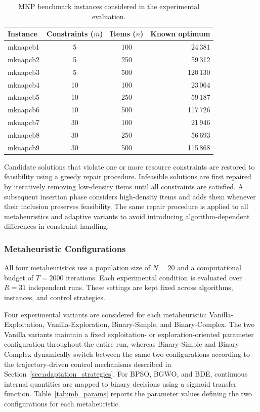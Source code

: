 \documentclass[journal,article,submit,moreauthors]{Definitions/mdpi}
\begin{document}
\begin{table}[htbp]
\centering
\caption{MKP benchmark instances considered in the experimental evaluation.}
\label{tab:instances}
\begin{tabular}{@{}l c c r@{}}
\toprule
\textbf{Instance} &
\textbf{Constraints ($m$)} &
\textbf{Items ($n$)} &
\textbf{Known optimum} \\
\midrule
mknapcb1 & 5  & 100 & 24\,381 \\
mknapcb2 & 5  & 250 & 59\,312 \\
mknapcb3 & 5  & 500 & 120\,130 \\
mknapcb4 & 10 & 100 & 23\,064 \\
mknapcb5 & 10 & 250 & 59\,187 \\
mknapcb6 & 10 & 500 & 117\,726 \\
mknapcb7 & 30 & 100 & 21\,946 \\
mknapcb8 & 30 & 250 & 56\,693 \\
mknapcb9 & 30 & 500 & 115\,868 \\
\bottomrule
\end{tabular}
\end{table}

Candidate solutions that violate one or more resource constraints are
restored to feasibility using a greedy repair procedure. Infeasible
solutions are first repaired by iteratively removing low-density items until
all constraints are satisfied. A subsequent insertion phase considers
high-density items and adds them whenever their inclusion preserves
feasibility. The same repair procedure is applied to all metaheuristics and
adaptive variants to avoid introducing algorithm-dependent differences in
constraint handling.


\subsubsection{Metaheuristic Configurations}
\label{sec:mh_config}

All four metaheuristics use a population size of $N=20$ and a computational
budget of $T=2000$ iterations. Each experimental condition is evaluated over
$R=31$ independent runs. These settings are kept fixed across algorithms,
instances, and control strategies.

Four experimental variants are considered for each metaheuristic:
Vanilla-Exploitation, Vanilla-Exploration, Binary-Simple, and Binary-Complex.
The two Vanilla variants maintain a fixed exploitation- or
exploration-oriented parameter configuration throughout the entire run,
whereas Binary-Simple and Binary-Complex dynamically switch between the same
two configurations according to the trajectory-driven control mechanisms
described in Section~\ref{sec:adaptation_strategies}. For BPSO, BGWO, and
BDE, continuous internal quantities are mapped to binary decisions using a
sigmoid transfer function. Table~\ref{tab:mh_params} reports the parameter
values defining the two configurations for each metaheuristic.
\end{document}
